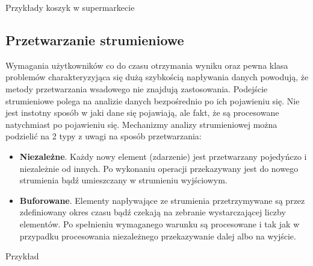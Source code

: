 Przykłady
koszyk w supermarkecie

\subsection{Przetwarzanie strumieniowe}

Wymagania użytkowników co do czasu otrzymania wyniku
oraz pewna klasa problemów charakteryzyjąca się dużą szybkością napływania danych powodują,
że metody przetwarzania wsadowego nie znajdują zastosowania.
Podejście strumieniowe polega na analizie danych bezpośrednio po ich pojawieniu się.
Nie jest instotny sposób w jaki dane się pojawiają,
ale fakt,
że są procesowane natychmiast po pojawieniu się.
Mechanizmy analizy strumieniowej można podzielić na 2 typy z uwagi na sposób przetwarzania:
\begin{itemize}
	\item \textbf{Niezależne}.
	Każdy nowy element (zdarzenie) jest przetwarzany pojedyńczo i niezależnie od innych.
	Po wykonaniu operacji przekazywany jest do nowego strumienia bądź umieszczany w strumieniu wyjściowym.
	\item \textbf{Buforowane}.
	Elementy napływające ze strumienia przetrzymywane są przez zdefiniowany okres czasu
	bądź czekają na zebranie wystarczającej liczby elementów.
	Po spełnieniu wymaganego warunku są procesowane
	i tak jak w przypadku procesowania niezależnego	przekazywanie dalej albo na wyjście.
\end{itemize}

Przykład
